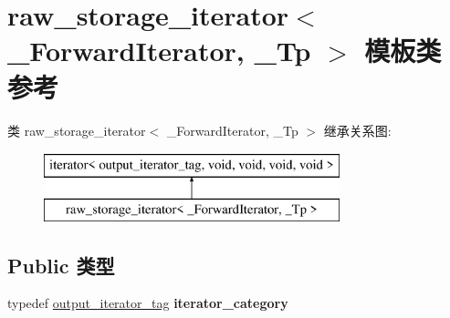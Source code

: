 \hypertarget{classraw__storage__iterator}{}\section{raw\+\_\+storage\+\_\+iterator$<$ \+\_\+\+Forward\+Iterator, \+\_\+\+Tp $>$ 模板类 参考}
\label{classraw__storage__iterator}
类 raw\+\_\+storage\+\_\+iterator$<$ \+\_\+\+Forward\+Iterator, \+\_\+\+Tp $>$ 继承关系图\+:\begin{figure}[H]
\begin{center}
\leavevmode
\includegraphics[height=2.000000cm]{classraw__storage__iterator}
\end{center}
\end{figure}
\subsection*{Public 类型}
\begin{DoxyCompactItemize}
\item 
\mbox{\label{classraw__storage__iterator_a83c5cb8bf1f633a0f061acc6100b44fc}} 
typedef \hyperlink{structoutput__iterator__tag}{output\+\_\+iterator\+\_\+tag} {\bfseries iterator\+\_\+category}
\end{DoxyCompactItemize}
